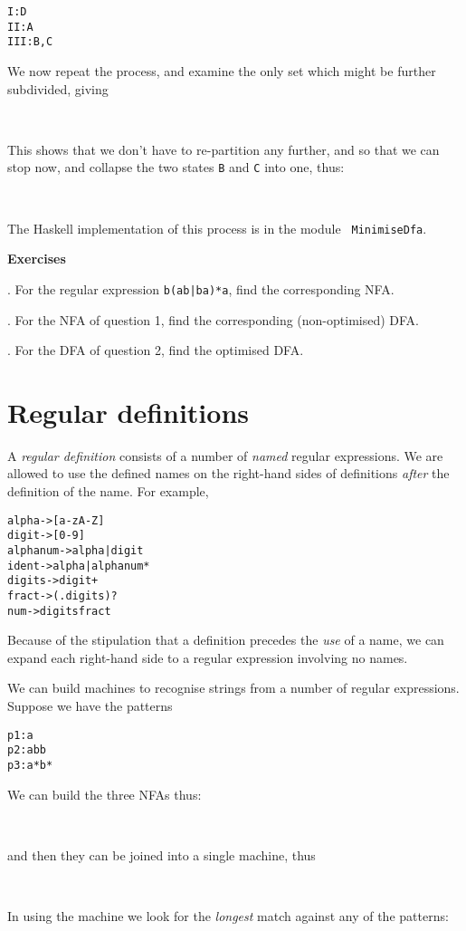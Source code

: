\documentclass[11pt]{article}
\begin{document}
\begin{alltt}
I:   D
II:  A
III: B,C
\end{alltt}
We now repeat the process, and
examine the only set which might be further subdivided, giving
\noindent
\begin{center}\  \end{center}
This shows that we don't have to re-partition any further, and so that we can
stop now, and collapse the two states {\tt B} and {\tt C} into one, thus:
\noindent
\begin{center}\  \end{center}

\noindent
The Haskell implementation of this process is in the module {\tt
MinimiseDfa}.

\medskip
\noindent
{\bf Exercises}

\medskip
{}. For the regular expression {\tt b(ab|ba)*a}, find the corresponding NFA.

\medskip
{}. For the NFA of question 1, find the corresponding (non-optimised) DFA.

\medskip
{}. For the DFA of question 2, find the optimised DFA.

\section{Regular definitions}

A {\em regular definition\/} consists of a number of {\em named\/} regular
expressions. We are allowed to use the defined names on the right-hand sides
of definitions {\em after\/} the definition of the name. For example,

\begin{alltt}
alpha    -> [a-zA-Z]
digit    -> [0-9]
alphanum -> alpha | digit
ident    -> alpha | alphanum*
digits   -> digit+
fract    -> (.digits)?
num      -> digits fract
\end{alltt}
Because of the stipulation that a definition precedes the {\em use\/} of a
name, we can expand each right-hand side to a regular expression involving no
names.

We can build machines to recognise strings from a number of regular
expressions. Suppose we have the patterns

\begin{alltt}
p1:  a
p2:  abb
p3: a*b*
\end{alltt}
We can build the three NFAs thus:
\noindent
\begin{center}\  \end{center}
and then they can be joined into a single machine, thus
\noindent
\begin{center}\  \end{center}
In using the machine we look for the {\em longest\/} match against any of the
patterns:
\end{document}
